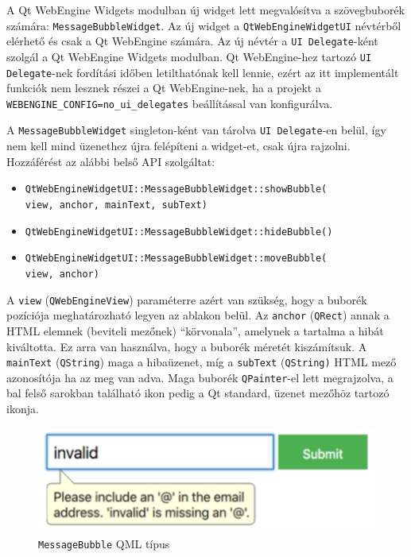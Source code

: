 \documentclass[12pt]{report}
\begin{document}
A Qt WebEngine Widgets modulban új widget lett megvalósítva a szövegbuborék számára:
\texttt{MessageBubbleWidget}. Az új widget a \texttt{QtWebEngineWidgetUI} névtérből
elérhető és csak a Qt WebEngine számára. Az új névtér a \texttt{UI Delegate}-ként szolgál
a Qt WebEngine Widgets modulban. Qt WebEngine-hez tartozó \texttt{UI Delegate}-nek fordítási
időben letilthatónak kell lennie, ezért az itt implementált funkciók nem lesznek részei
a Qt WebEngine-nek, ha a projekt a \texttt{WEBENGINE\_CONFIG=no\_ui\_delegates} beállítással
van konfigurálva.

A \texttt{MessageBubbleWidget} singleton-ként van tárolva \texttt{UI Delegate}-en belül,
így nem kell mind üzenethez újra felépíteni a widget-et, csak újra rajzolni. Hozzáférést
az alábbi belső API szolgáltat:
\begin{itemize}
    \item \texttt{QtWebEngineWidgetUI::MessageBubbleWidget::showBubble(} \\
                    \texttt{view, anchor, mainText, subText)}
    \item \texttt{QtWebEngineWidgetUI::MessageBubbleWidget::hideBubble()}
    \item \texttt{QtWebEngineWidgetUI::MessageBubbleWidget::moveBubble(} \\
                    \texttt{view, anchor)}
\end{itemize}
A \texttt{view} (\texttt{QWebEngineView}) paraméterre azért van szükség, hogy a buborék
pozíciója meghatározható legyen az ablakon belül. Az \texttt{anchor} (\texttt{QRect}) annak
a HTML elemnek (beviteli mezőnek) ``körvonala'', amelynek a tartalma a hibát kiváltotta.
Ez arra van használva, hogy a buborék méretét kiszámítsuk. A \texttt{mainText}
(\texttt{QString}) maga a hibaüzenet, míg a \texttt{subText} (\texttt{QString)} HTML mező
azonosítója ha az meg van adva. Maga buborék \texttt{QPainter}-el lett megrajzolva, a bal
felső sarokban található ikon pedig a Qt standard, üzenet mezőhöz tartozó ikonja.

\begin{figure}[ht]
    \centering
    \includegraphics[scale=0.75]{bubi-quick-screenshot}
    \caption{
        \label{fig:bubi-quick-screenshot}
        \texttt{MessageBubble} QML típus
    }
\end{figure}
\end{document}
